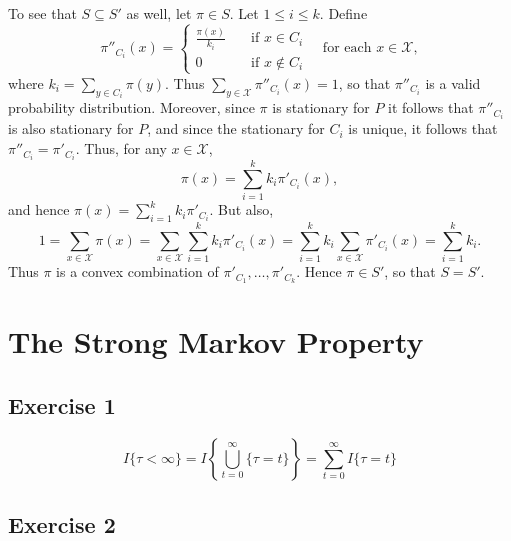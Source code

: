 \documentclass[12pt]{article}
\begin{document}
To see that $S \subseteq S'$ as well, let $\pi \in S$. Let $1 \leq i \leq k$. Define
\begin{equation*}
\pi''_{C_i}(x) = \begin{cases}
\frac{\pi(x)}{k_i} & \quad \text{if $x \in C_i$} \\
0 & \quad \text{if $x \not \in C_i$}
\end{cases} \quad \text{for each $x \in \mathcal{X}$},
\end{equation*}
where $k_i = \sum_{y \in C_i} \pi(y)$. Thus $\sum_{y \in \mathcal{X}} \pi''_{C_i}(x) = 1$, so that $\pi''_{C_i}$ is a valid probability distribution. Moreover, since $\pi$ is stationary for $P$ it follows that $\pi''_{C_i}$ is also stationary for $P$, and since the stationary for $C_i$ is unique, it follows that $\pi''_{C_i} = \pi'_{C_i}$. Thus, for any $x \in \mathcal{X}$,
\begin{equation*}
\pi(x) = \sum_{i=1}^k k_i \pi'_{C_i}(x),
\end{equation*}
and hence $\pi(x) = \sum_{i=1}^k k_i \pi'_{C_i}$. But also,
\begin{equation*}
1 = \sum_{x \in \mathcal{X}} \pi(x) = \sum_{x \in \mathcal{X}} \sum_{i=1}^k k_i \pi'_{C_i}(x) = \sum_{i=1}^k k_i \sum_{x \in \mathcal{X}} \pi'_{C_i}(x) = \sum_{i=1}^k k_i.
\end{equation*}
Thus $\pi$ is a convex combination of $\pi'_{C_1}, \ldots, \pi'_{C_k}$. Hence $\pi \in S'$, so that $S = S'$.

\section*{The Strong Markov Property}

\subsection*{Exercise 1}

\begin{equation*}
I\{\tau < \infty\} = I\left\{\bigcup_{t = 0}^\infty \{\tau = t\} \right\} = \sum_{t = 0}^\infty I\{\tau = t\}
\end{equation*}

\subsection*{Exercise 2}
\end{document}
